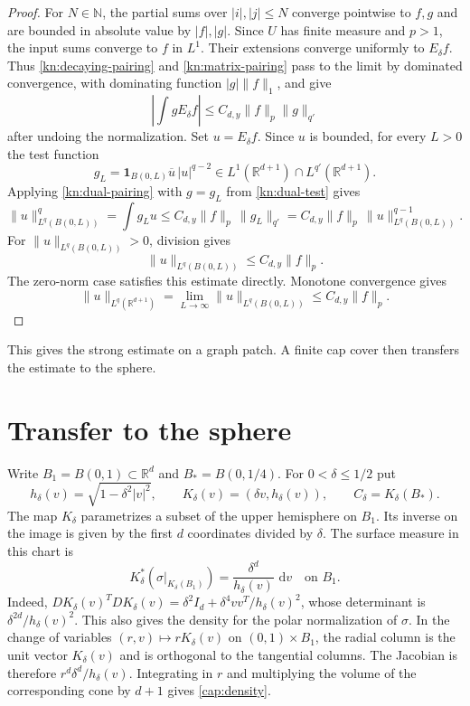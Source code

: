 \documentclass[11pt]{article}
\numberwithin{equation}{section}
\newcommand{\R}{\mathbb{R}}
\newcommand{\dd}{\,\mathrm{d}}
\newcommand{\norm}[1]{\lVert #1\rVert}
\newcommand{\abs}[1]{\lvert #1\rvert}
\begin{document}
\begin{proof}
For \(N\in\mathbb N\), the partial sums over \(|i|,|j|\le N\)
converge pointwise to \(f,g\)
and are bounded in absolute value by \(|f|,|g|\). Since \(U\) has
finite measure and \(p>1\), the input sums converge to \(f\) in
\(L^1\). Their extensions converge uniformly to \(E_\delta f\).
Thus \eqref{kn:decaying-pairing} and \eqref{kn:matrix-pairing}
pass to the limit by dominated convergence, with dominating function
\(|g|\norm{f}_1\), and give
\begin{equation}\label{kn:dual-pairing}
 \left|\int g E_\delta f\right|\le C_{d,y}\norm{f}_p\norm{g}_{q'}
\end{equation}
after undoing the normalization. Set \(u=E_\delta f\). Since
\(u\) is bounded, for every \(L>0\) the test function
\begin{equation}\label{kn:dual-test}
 g_L=\mathbf1_{B(0,L)}\overline u\,|u|^{q-2}
 \in L^1(\R^{d+1})\cap L^{q'}(\R^{d+1}).
\end{equation}
Applying \eqref{kn:dual-pairing} with \(g=g_L\) from
\eqref{kn:dual-test} gives
\[
 \norm{u}_{L^q(B(0,L))}^q
 =\int g_Lu
 \le C_{d,y}\norm f_p\,\norm{g_L}_{q'}
 =C_{d,y}\norm f_p\,\norm{u}_{L^q(B(0,L))}^{q-1}.
\]
For \(\norm{u}_{L^q(B(0,L))}>0\), division gives
\[
 \norm{u}_{L^q(B(0,L))}\le C_{d,y}\norm f_p.
\]
The zero-norm case satisfies this estimate directly. Monotone convergence gives
\[
 \norm{u}_{L^q(\R^{d+1})}
 =\lim_{L\to\infty}\norm{u}_{L^q(B(0,L))}
 \le C_{d,y}\norm f_p.
\]
\end{proof}

This gives the strong estimate on a graph patch. A finite cap cover
then transfers the estimate to the sphere.


\section{Transfer to the sphere}\label{cap:section}

Write $B_1=B(0,1)\subset\R^d$ and $B_*=B(0,1/4)$. For
$0<\delta\le 1/2$ put
\[
 h_\delta(v)=\sqrt{1-\delta^2\abs{v}^2},\qquad
 K_\delta(v)=(\delta v,h_\delta(v)),\qquad
 C_\delta=K_\delta(B_*).
\]
The map $K_\delta$ parametrizes a subset of the upper hemisphere on $B_1$.
Its inverse on the image is given by the first $d$ coordinates divided by
$\delta$. The surface measure in this chart is
\begin{equation}\label{cap:density}
 K_\delta^*(\sigma|_{K_\delta(B_1)})
   =\frac{\delta^d}{h_\delta(v)}\,\dd v
   \quad\text{on }B_1.
\end{equation}
Indeed, $D K_\delta(v)^T D K_\delta(v)
=\delta^2 I_d+\delta^4 vv^T/h_\delta(v)^2$, whose determinant is
$\delta^{2d}/h_\delta(v)^2$. This also gives the density for the polar
normalization of $\sigma$. In the change of variables
$(r,v)\mapsto rK_\delta(v)$ on $(0,1)\times B_1$, the radial column is
the unit vector $K_\delta(v)$ and is orthogonal to the tangential
columns. The Jacobian is therefore $r^d\delta^d/h_\delta(v)$.
Integrating in $r$ and multiplying the volume of the corresponding
cone by $d+1$ gives \eqref{cap:density}.
\end{document}
